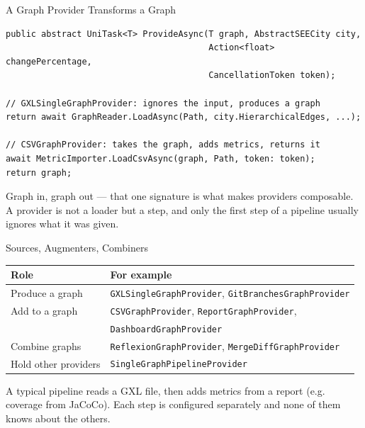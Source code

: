 \begin{frame}[fragile]{A Graph Provider Transforms a Graph}
  \begin{lstlisting}[basicstyle=\scriptsize\ttfamily]
public abstract UniTask<T> ProvideAsync(T graph, AbstractSEECity city,
                                        Action<float> changePercentage,
                                        CancellationToken token);

// GXLSingleGraphProvider: ignores the input, produces a graph
return await GraphReader.LoadAsync(Path, city.HierarchicalEdges, ...);

// CSVGraphProvider: takes the graph, adds metrics, returns it
await MetricImporter.LoadCsvAsync(graph, Path, token: token);
return graph;
  \end{lstlisting}
  \vspace{1ex}

  Graph in, graph out --- that one signature is what makes providers
  composable. A provider is not a loader but a step, and only the first step
  of a pipeline usually ignores what it was given.
\end{frame}

\begin{frame}{Sources, Augmenters, Combiners}
  \begin{center}
    \footnotesize
    \begin{tabular}{ll}
      \hline
      \textbf{Role} & \textbf{For example}\\
      \hline
      Produce a graph      & \texttt{GXLSingleGraphProvider},
                             \texttt{GitBranchesGraphProvider}\\
      Add to a graph       & \texttt{CSVGraphProvider}, \texttt{ReportGraphProvider},\\
                           & \texttt{DashboardGraphProvider}\\
      Combine graphs       & \texttt{ReflexionGraphProvider},
                             \texttt{MergeDiffGraphProvider}\\
      Hold other providers & \texttt{SingleGraphPipelineProvider}\\
      \hline
    \end{tabular}
  \end{center}
  \vspace{2ex}

  A typical pipeline reads a GXL file, then adds metrics
  from a report (e.g. coverage from JaCoCo). Each step is configured
  separately and none of them knows about the others.
  \vspace{1ex}

\end{frame}

